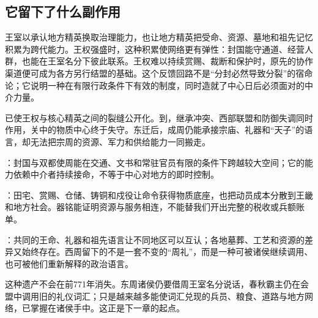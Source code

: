 \subsection{它留下了什么副作用}

王室以承认地方精英换取治理能力，也让地方精英把受命、资源、墓地和祖先记忆积累为跨代能力。王权强盛时，这种积累使网络更有弹性：封国能守通道、经营人群，也能在王室名分下彼此联系。王权难以持续赏赐、裁断和保护时，原先的协作渠道便可成为各方另行结盟的基础。这个反馈回路不是“分封必然导致分裂”的宿命论；它说明一种在有限行政条件下有效的制度，同时造就了中心日后必须面对的中介力量。

已使王权与核心精英之间的裂缝公开化。到，继承冲突、西部联盟和防御失调同时作用，关中的物质中心终于失守。东迁后，成周仍能承接宗庙、礼器和“天子”的语言，却无法把宗周的资源、军力和供给能力一同搬走。

\begin{turningpoint}
：封国与双都使周能在交通、文书和常驻官员有限的条件下跨越较大空间；它的能力依赖中介者持续接命，不等于中心对地方的即时控制。

：田宅、赏赐、仓储、铸铜和戍役让命令获得物质底座，也把动员成本分散到王畿和地方社会。器铭能证明资源与服务相连，不能替我们开出完整的税收或兵额账单。

：共同的王命、礼器和祖先语言让不同地区可以互认；各地墓葬、工艺和资源的差异又始终存在。西周留下的不是一套不变的“周礼”，而是一种可被诸侯继续调用、也可被他们重新解释的政治语言。
\end{turningpoint}

这种遗产不会在前771年消失。东周诸侯仍要借周王室名分说话，春秋霸主仍在会盟中调用旧的礼仪词汇；只是越来越多能使词汇兑现的兵员、粮食、道路与地方网络，已掌握在诸侯手中。这正是下一章的起点。
